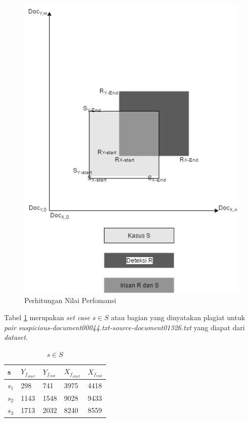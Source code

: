 \documentclass[../Book.tex]{subfiles}
\begin{document}
	\begin{center}
		\begin{figure}[H]
			\includegraphics[width=\linewidth]{../images/perfomansi}
			\caption{Perhitungan Nilai Perfomansi}
			\label{fig:perfomansi}
		\end{figure}
	\end{center}

	\noindent Tabel \ref{s} merupakan \textit{set case} $s \in S$ atau bagian yang dinyatakan plagiat untuk \textit{pair suspicious-document00044.txt-source-document01326.txt} yang diapat dari \textit{dataset}.
	
	\begin{table}[H]
		\centering
		\caption{$s \in S$}
		\label{s}
		\begin{tabular}{lllll}
			\hline
			s       & $Y_{f_{start}}$ & $Y_{f_{end}}$ & $X_{f_{start}}$ & $X_{f_{end}}$ \\ \hline
			$s_{1}$ & 298             & 741           & 3975            & 4418          \\
			$s_{2}$ & 1143            & 1548          & 9028            & 9433          \\
			$s_{3}$ & 1713            & 2032          & 8240            & 8559          \\ \hline
		\end{tabular}
	\end{table}
	
\end{document}
